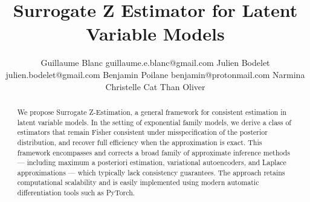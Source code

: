 \documentclass[twoside,11pt]{article}
\begin{document}
\title{Surrogate Z Estimator for Latent Variable Models}

\author{\name Guillaume Blanc \email guillaume.e.blanc@gmail.com
  \AND
  \name Julien Bodelet \email julien.bodelet@gmail.com
  \AND
  \name Benjamin Poilane \email benjamin@protonmail.com
  \AND
  \name Narmina Christelle Cat Than Oliver
}


\maketitle

\begin{abstract}
We propose Surrogate Z-Estimation, a general framework for consistent estimation in latent variable models. In the setting of exponential family models, we derive a class of estimators that remain Fisher consistent under misspecification of the posterior distribution, and recover full efficiency when the approximation is exact. This framework encompasses and corrects a broad family of approximate inference methods — including maximum a posteriori estimation, variational autoencoders, and Laplace approximations — which typically lack consistency guarantees. The approach retains computational scalability and is easily implemented using modern automatic differentiation tools such as PyTorch.
\end{abstract}



\newpage

\listoftodos

\newpage
\end{document}
